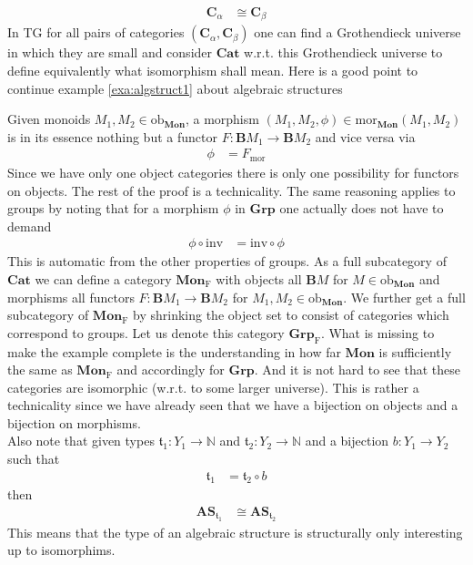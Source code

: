 \begin{align*}
  \mathbf{C}_{\alpha}
  &\cong
  \mathbf{C}_{\beta}
\end{align*}
In TG for all pairs of categories $(\mathbf{C}_{\alpha},\mathbf{C}_{\beta})$ one can find a Grothendieck universe in which they are small and consider $\mathbf{Cat}$ w.r.t. this Grothendieck universe to define equivalently what isomorphism shall mean. Here is a good point to continue example \ref{exa:algstruct1} about algebraic structures
\\
\begin{exa}
\label{exa:algstruct2}
Given monoids $M_{1},M_{2} \in \mathrm{ob}_{\mathbf{Mon}}$, a morphism $(M_{1},M_{2},\phi) \in \mathrm{mor}_{\mathbf{Mon}}(M_{1},M_{2})$ is in its essence nothing but a functor $F \colon \mathbf{B}M_{1} \rightarrow \mathbf{B}M_{2}$ and vice versa via
\begin{align*}
  \phi
  &=
  F_{\mathrm{mor}}
\end{align*}
Since we have only one object categories there is only one possibility for functors on objects. The rest of the proof is a technicality. The same reasoning applies to groups by noting that for a morphism $\phi$ in $\mathbf{Grp}$ one actually does not have to demand
\begin{align*}
  \phi
  \circ
  \mathrm{inv}
  &=
  \mathrm{inv}
  \circ
  \phi
\end{align*}
This is automatic from the other properties of groups. As a full subcategory of $\mathbf{Cat}$ we can define a category $\mathbf{Mon}_{\mathrm{F}}$ with objects all $\mathbf{B}M$ for $M \in \mathrm{ob}_{\mathbf{Mon}}$ and morphisms all functors $F \colon \mathbf{B}M_{1} \rightarrow \mathbf{B}M_{2}$ for $M_{1},M_{2} \in \mathrm{ob}_{\mathbf{Mon}}$. We further get a full subcategory of $\mathbf{Mon}_{\mathrm{F}}$ by shrinking the object set to consist of categories which correspond to groups. Let us denote this category $\mathbf{Grp}_{\mathrm{F}}$. What is missing to make the example complete is the understanding in how far $\mathbf{Mon}$ is sufficiently the same as $\mathbf{Mon}_{\mathrm{F}}$ and accordingly for $\mathbf{Grp}$. And it is not hard to see that these categories are isomorphic (w.r.t. to some larger universe). This is rather a technicality since we have already seen that we have a bijection on objects and a bijection on morphisms.
\\
Also note that given types $\mathfrak{t}_{1} \colon Y_{1} \rightarrow \mathbb{N}$ and $\mathfrak{t}_{2} \colon Y_{2} \rightarrow \mathbb{N}$ and a bijection $b \colon Y_{1} \rightarrow Y_{2}$ such that
\begin{align*}
  \mathfrak{t}_{1}
  &=
  \mathfrak{t}_{2}
  \circ
  b
\end{align*}
then
\begin{align*}
  \mathbf{AS}_{\mathfrak{t}_{1}}
  &\cong
  \mathbf{AS}_{\mathfrak{t}_{2}}
\end{align*}
This means that the type of an algebraic structure is structurally only interesting up to isomorphims.
\end{exa}
